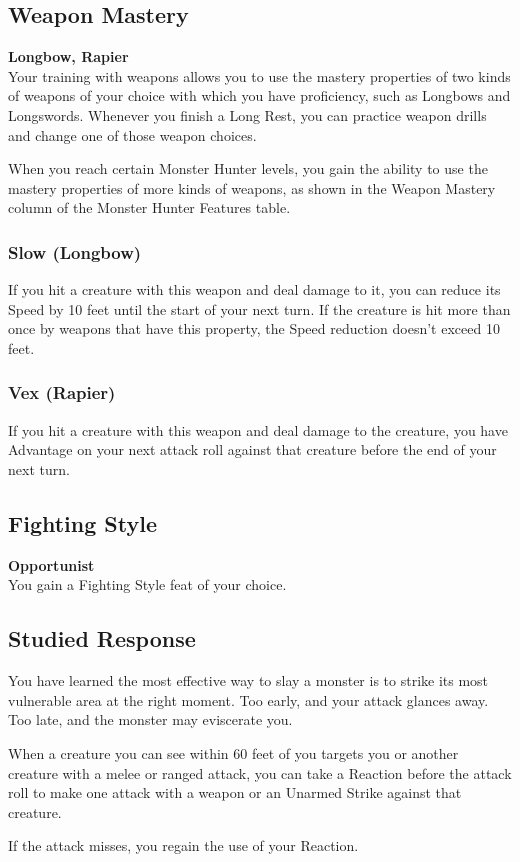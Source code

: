 \documentclass[letterpaper,openany,oneside,twocolumn]{book}
\begin{document}
\subsection*{Weapon Mastery}
\textbf{Longbow, Rapier}\\
Your training with weapons allows you to use the mastery properties of two kinds of weapons of your choice with which you have proficiency, such as Longbows and Longswords. Whenever you finish a Long Rest, you can practice weapon drills and change one of those weapon choices.

When you reach certain Monster Hunter levels, you gain the ability to use the mastery properties of more kinds of weapons, as shown in the Weapon Mastery column of the Monster Hunter Features table.
\subsubsection*{Slow (Longbow)}
If you hit a creature with this weapon and deal damage to it, you can reduce its Speed by 10 feet until the start of your next turn. If the creature is hit more than once by weapons that have this property, the Speed reduction doesn't exceed 10 feet.
\subsubsection*{Vex (Rapier)}
If you hit a creature with this weapon and deal damage to the creature, you have Advantage on your next attack roll against that creature before the end of your next turn.
\subsection*{Fighting Style}
\textbf{Opportunist}\\
You gain a Fighting Style feat of your choice.
\subsection*{Studied Response}
You have learned the most effective way to slay a monster is to strike its most vulnerable area at the right moment. Too early, and your attack glances away. Too late, and the monster may eviscerate you.

When a creature you can see within 60 feet of you targets you or another creature with a melee or ranged attack, you can take a Reaction before the attack roll to make one attack with a weapon or an Unarmed Strike against that creature.

If the attack misses, you regain the use of your Reaction.
\end{document}
